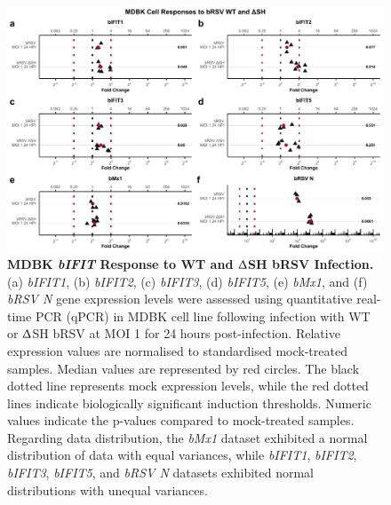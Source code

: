 \begin{figure}
    \centering
    \includegraphics[width=1\linewidth]{07. Chapter 2/Figs/02. Induction/05. mdbk_brsv_moi1_dsh.pdf}
    \caption[MDBK \textit{bIFIT} Response to WT and $\Updelta$SH bRSV Infection.]{\textbf{MDBK \textit{bIFIT} Response to WT and $\Updelta$SH bRSV Infection.} (a) \textit{bIFIT1}, (b) \textit{bIFIT2}, (c) \textit{bIFIT3}, (d) \textit{bIFIT5}, (e) \textit{bMx1}, and (f) \textit{bRSV N} gene expression levels were assessed using quantitative real-time PCR (qPCR) in MDBK cell line following infection with WT or $\Updelta$SH bRSV at MOI 1 for 24 hours post-infection. Relative expression values are normalised to standardised mock-treated samples. Median values are represented by red circles. The black dotted line represents mock expression levels, while the red dotted lines indicate biologically significant induction thresholds. Numeric values indicate the p-values compared to mock-treated samples. Regarding data distribution, the \textit{bMx1} dataset exhibited a normal distribution of data with equal variances, while \textit{bIFIT1}, \textit{bIFIT2}, \textit{bIFIT3}, \textit{bIFIT5}, and \textit{bRSV N} datasets exhibited normal distributions with unequal variances.}
    \label{fig:MDBK responses to dSH}
\end{figure}

